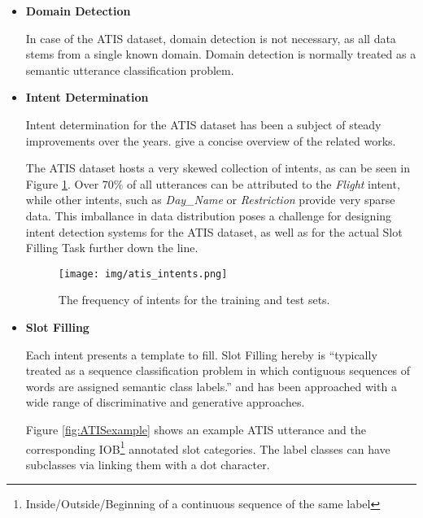 \documentclass[11pt,a4paper,twoside,openright]{scrbook}
\begin{document}
\begin{itemize}
\item{\textbf{Domain Detection}}

In case of the ATIS dataset, domain detection is not necessary, as all data stems from a single known domain. Domain detection is normally treated as a semantic utterance classification problem.\cite{Mesnil15}

\item{\textbf{Intent Determination}}

Intent determination for the ATIS dataset has been a subject of steady improvements over the years. \cite{Tur10} give a concise overview of the related works.

The ATIS dataset hosts a very skewed collection of intents, as can be seen in Figure \ref{fig:atisintents}.
Over 70\% of all utterances can be attributed to the \emph{Flight} intent, while other intents, such as \emph{Day\_Name} or \emph{Restriction} provide very sparse data. This imballance in data distribution poses a challenge for designing intent detection systems for the ATIS dataset, as well as for the actual Slot Filling Task further down the line.

\begin{figure}[h]
  \centering
  \texttt{[image: img/atis\_intents.png]}
  \caption{The frequency of intents for the training and test sets. \cite[p.\,20]{Tur10}}
  \label{fig:atisintents}
\end{figure}

\item{\textbf{Slot Filling}}

Each intent presents a template to fill. Slot Filling hereby is ``typically treated as a sequence classification problem in which contiguous sequences of words are assigned semantic class labels.''\cite{Mesnil15} and has been approached with a wide range of discriminative and generative approaches. \cite[e.g.]{Wang05,Mesnil13}


Figure \ref{fig:ATISexample}
shows an example ATIS utterance and the corresponding IOB\footnote{Inside/Outside/Beginning of a continuous sequence of the same label} annotated slot categories. The label classes can have subclasses via linking them with a dot character.


\end{itemize}
\end{document}
